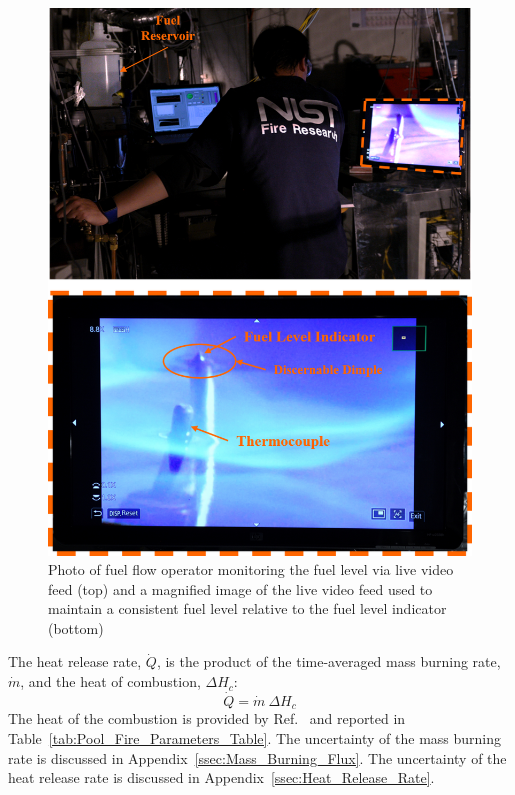 \documentclass[12pt]{article}
\begin{document}
\begin{figure}[h!]
	\centering
\includegraphics[width=14.0cm,keepaspectratio]{Monitoring_Fuel_Level_A.png}
	\caption[Photographs of the fuel monitoring process]{Photo of fuel flow operator monitoring the fuel level via live video feed (top) and a magnified image of the live video feed used to maintain a consistent fuel level relative to the fuel level indicator (bottom)}
	\label{fig:Fuel_Level}
\end{figure}

The heat release rate, $\dot{Q}$, is the product of the time-averaged mass burning rate, $\dot{m}$, and the heat of combustion, $\Delta H_{c}$:
\begin{equation}\label{eq:Heat_release_rate}
\dot{Q}= \dot{m}~\Delta H_{c}
\end{equation}
The heat of the combustion is provided by Ref.~\cite{Dippr} and reported in Table~\ref{tab:Pool_Fire_Parameters_Table}. The uncertainty of the mass burning rate is discussed in Appendix~\ref{ssec:Mass_Burning_Flux}. The uncertainty of the heat release rate is discussed in Appendix~\ref{ssec:Heat_Release_Rate}.
\end{document}
